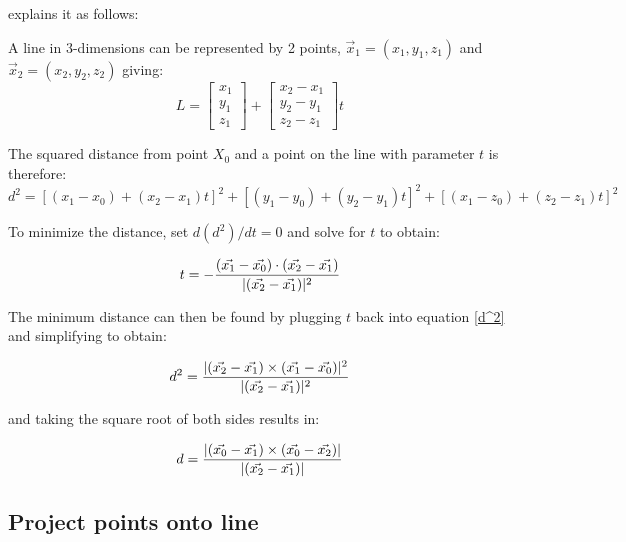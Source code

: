 	\noindent\cite{weisstein_point-line_????} explains it as follows:
	
	A line in 3-dimensions can be represented by 2 points, $\vec{x}_1 = (x_1,y_1,z_1)$ and $\vec{x}_2 = (x_2,y_2,z_2)$ giving:\\
	
	\begin{equation}\label{LineEqn}
	L = \begin{bmatrix}
	x_1 \\
	y_1\\
	z_1 
	\end{bmatrix} + \begin{bmatrix}
	x_2 - x_1 \\
	y_2 - y_1\\
	z_2 - z_1
	\end{bmatrix}t
	\end{equation}
	
	\noindent The squared distance from point $X_0$ and a point on the line with parameter $t$ is therefore:
	\begin{equation}\label{d^2}
	d^2 = [(x_1 - x_0) + (x_2 - x_1)t]^2 + [(y_1 - y_0) + (y_2 - y_1)t]^2  + [(x_1 - z_0) + (z_2 - z_1)t]^2 
	\end{equation}

	\noindent To minimize the distance, set $d(d^2)/dt = 0$ and solve for $t$ to obtain:
	
	\begin{equation}\label{formT}
	t = - \frac{(\vec{x_1} - \vec{x_0}) \cdot (\vec{x_2} - \vec{x_1})  }{\lvert (\vec{x_2} - \vec{x_1}) \rvert^2}
	\end{equation}
	
	The minimum distance can then be found by plugging $t$ back into equation \ref{d^2} and simplifying to obtain:
	
	\begin{equation}
	d^2 = \frac{ \lvert  (\vec{x_2} - \vec{x_1}) \times (\vec{x_1} - \vec{x_0}) \rvert^2  }{\lvert (\vec{x_2} - \vec{x_1}) \rvert^2}
	\end{equation}
	
	and taking the square root of both sides results in:
	
	\begin{equation}
	d = \frac{ \lvert  (\vec{x_0} - \vec{x_1}) \times (\vec{x_0} - \vec{x_2}) \rvert}{\lvert (\vec{x_2} - \vec{x_1}) \rvert}
	\end{equation}

	\subsection{Project points onto line}
	
